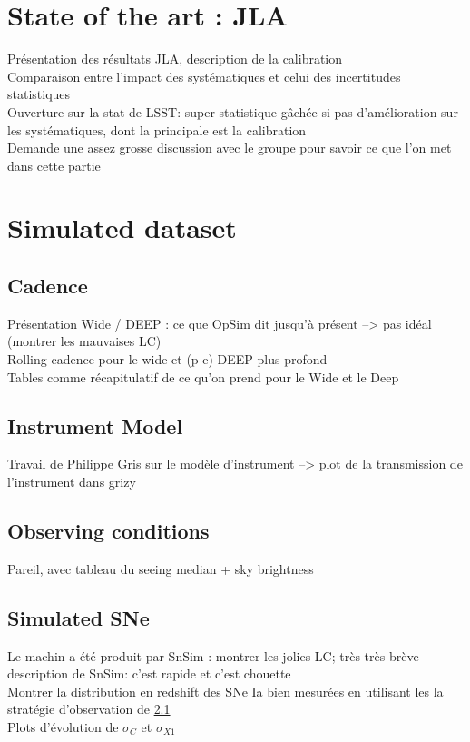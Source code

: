 \documentclass[\docopts]{\docclass}
\begin{document}

\section{State of the art : JLA}
\label{sec::jla}

Présentation des résultats JLA, description de la calibration \\
Comparaison entre l'impact des systématiques et celui des incertitudes statistiques \\
Ouverture sur la stat de LSST: super statistique gâchée si pas d'amélioration sur les systématiques, dont la principale est la calibration \\
Demande une assez grosse discussion avec le groupe pour savoir ce que l'on met dans cette partie


\section{Simulated dataset}
\label{sec::simulated_dataset}

\subsection{Cadence}
\label{subsec::cadence}
Présentation Wide / DEEP : ce que OpSim dit jusqu'à présent --> pas idéal (montrer les mauvaises LC)\\
Rolling cadence pour le wide et (p-e) DEEP plus profond\\
Tables comme récapitulatif de ce qu'on prend pour le Wide et le Deep\\

\subsection{Instrument Model}
Travail de Philippe Gris sur le modèle d'instrument --> plot de la transmission de l'instrument dans grizy

\subsection{Observing conditions}
Pareil, avec tableau du seeing median + sky brightness

\subsection{Simulated SNe}
\label{ssec::snsim}
Le machin a été produit par SnSim : montrer les jolies LC; très très brève description de SnSim: c'est rapide et c'est chouette \\
Montrer la distribution en redshift des SNe Ia bien mesurées en utilisant les la stratégie d'observation de \ref{subsec::cadence} \\
Plots d'évolution de $\sigma_C$ et $\sigma_{X1}$
\end{document}
